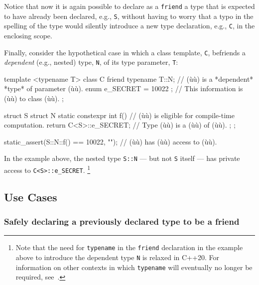 \noindent Notice that now it is again possible to declare as a \lstinline!friend! a
type that is expected to have already been declared, e.g., \lstinline!S!,
without having to worry that a typo in the spelling of the type would
silently introduce a new type declaration, e.g., \lstinline!C!, in the
enclosing scope.

Finally, consider the hypothetical case in which a class template,
\lstinline!C!, befriends a \emph{dependent} (e.g., nested) type, \lstinline!N!,
of its type parameter, \lstinline!T!:

\begin{emcppslisting}[emcppsbatch=e6]
template <typename T>
class C
{
    friend typename T::N;       // (ù{}ù) is a *dependent* *type* of parameter (ù{}ù).
    enum { e_SECRET = 10022 };  // This information is (ù{}ù) to class (ù{}ù).
};

struct S
{
    struct N
    {
        static constexpr int f()  // (ù{}ù) is eligible for compile-time computation.
        {
            return C<S>::e_SECRET;  // Type (ù{}ù) is a (ù{}ù) of (ù{}ù).
        }
    };
};

static_assert(S::N::f() == 10022, "");  // (ù{}ù) has (ù{}ù) access to (ù{}ù).
\end{emcppslisting}
    
\noindent In the example above, the nested type \lstinline!S::N! --- but not
\lstinline!S! itself --- has private access to \lstinline!C<S>::e_SECRET!.
{\cprotect\footnote{Note that the need for \lstinline!typename! in the \lstinline!friend!
declaration in the example above to introduce the dependent type \lstinline!N! is relaxed
in C++20. For information on other contexts in which
\lstinline!typename! will eventually no longer be required, see~\cite{meredith20}.}}

\subsection[Use Cases]{Use Cases}\label{use-cases}

\subsubsection[Safely declaring a previously declared type to be a friend]{Safely declaring a previously declared type to be a friend}\label{safely-declaring-a-previously-declared-type-to-be-a-friend}


